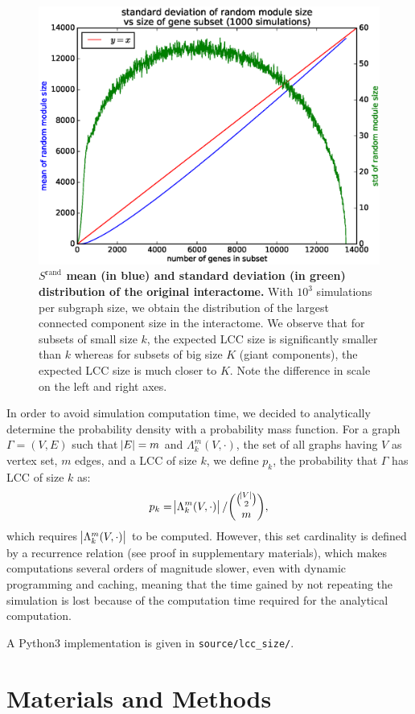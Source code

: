 \documentclass[letterpaper]{article}
\begin{document}
\begin{figure}[!h]
	\hspace{-.2cm}
	\includegraphics[width=.5\textwidth]{images/Srand_distribution_1000_sims.eps}
	\vspace{-.5cm}
	\caption{{\bf $S^{\text{rand}}$ mean (in blue) and standard deviation (in green) distribution of the original
	interactome.} With $10^3$ simulations per subgraph size, we obtain the distribution of the largest connected
	component size in the interactome. We observe that for subsets of small size $k$, the expected LCC size is
	significantly smaller than $k$ whereas for subsets of big size $K$ (giant components), the expected LCC
	size is much closer to $K$. Note the difference in scale on the left and right axes.
	\label{fig:Srand distribution}}
\end{figure}

In order to avoid simulation computation time, we decided to analytically determine the probability density
with a probability mass function. For a graph $\Gamma = (V, E)$ such that $\abs E = m$ and
$\Lambda_k^m(V, \cdot)$, the set of all graphs having $V$ as vertex set, $m$ edges, and a LCC of size $k$,
we define $p_k$, the probability that $\Gamma$ has LCC of size $k$ as:
\begin{equation}
	p_k = \abs {\Lambda_k^m(V, \cdot)}/\binom {\binom {\abs V}2}m,
\end{equation}
which requires $\abs {\Lambda_k^m(V, \cdot)}$ to be computed. However, this set cardinality is defined by a
recurrence relation (see proof in supplementary materials), which makes computations several orders of
magnitude slower, even with dynamic programming and caching, meaning that the time gained by not repeating
the simulation is lost because of the computation time required for the analytical computation.

A Python3 implementation is given in \texttt{source/lcc\_size/}.

\section{Materials and Methods}
\end{document}
